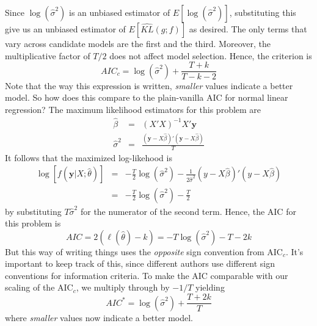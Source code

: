 \documentclass[12pt]{article}
\theoremstyle{definition}
\begin{document}
Since $\log(\widehat{\sigma}^2)$ is an unbiased estimator of $E[\log(\widehat{\sigma}^2)]$, substituting this give us an unbiased estimator of $E\left[\widehat{KL}(g;f) \right]$ as desired.
The only terms that vary across candidate models are the first and the third. Moreover, the multiplicative factor of $T/2$ does not affect model selection. Hence, the criterion is
$$AIC_c = \log(\widehat{\sigma}^2) + \frac{T + k}{T - k -2}$$
Note that the way this expression is written, \emph{smaller} values indicate a better model. So how does this compare to the plain-vanilla AIC for normal linear regression? The maximum likelihood estimators for this problem are
\begin{eqnarray*}
\widehat{\beta} &=& (X'X)^{-1}X'\mathbf{y}\\
\widehat{\sigma}^2 &=& \frac{(\mathbf{y} - X\widehat{\beta})'(\mathbf{y} - X\widehat{\beta})}{T}
\end{eqnarray*}
It follows that the maximized log-likehood is
\begin{eqnarray*}
\log\left[f(\mathbf{y}|X;\widehat{\theta})\right] &=& -\frac{T}{2} \log(\widehat{\sigma}^2) - \frac{1}{2\widehat{\sigma}^2}(y - X\widehat{\beta})'(y -X\widehat{\beta})\\
&=& -\frac{T}{2} \log(\widehat{\sigma}^2) - \frac{T}{2}
\end{eqnarray*}
by substituting $T\widehat{\sigma}^2$ for the numerator of the second term. Hence, the AIC for this problem is
$$AIC = 2\left(\ell(\widehat{\theta}) - k \right) = -T\log(\widehat{\sigma}^2) - T - 2k $$
But this way of writing things uses the \emph{opposite} sign convention from AIC$_c$. It's important to keep track of this, since different authors use different sign conventions for information criteria. To make the AIC comparable with our scaling of the AIC$_c$, we multiply through by $-1/T$ yielding
$$AIC^* = \log(\widehat{\sigma}^2) + \frac{T + 2k}{T}$$
where \emph{smaller} values now indicate a better model.
\end{document}
